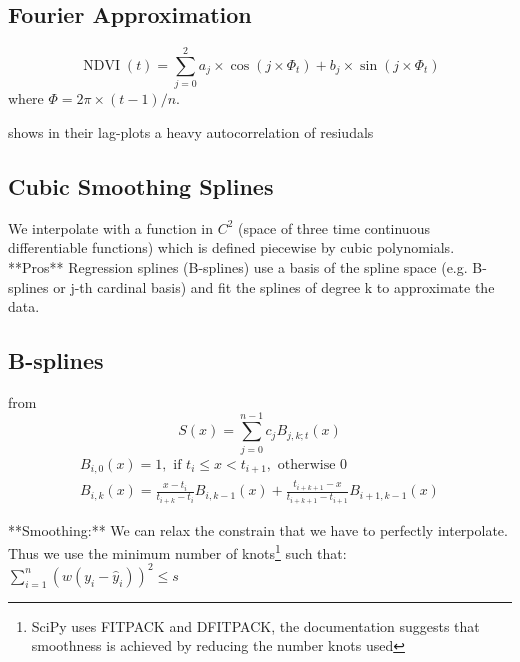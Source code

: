 \subsection{Fourier Approximation}
\label{sec:fourier_approx}
$$
    \operatorname{NDVI}(t)=\sum_{j=0}^{2} a_{j} \times \cos \left(j \times \Phi_{t}\right)+b_{j} \times \sin \left(j \times \Phi_{t}\right)
$$
where $\Phi=2 \pi \times(t-1) / n$.

\cite{beckImprovedMonitoringVegetation2006} shows in their lag-plots a heavy autocorrelation of resiudals





\subsection{Cubic Smoothing Splines}
\label{sec:Cubic}
We interpolate with a function in $C^2$ (space of three time continuous differentiable functions) which is defined piecewise by cubic polynomials.
**Pros**
Regression splines (B-splines)
\cite{woodSmoothingParameterModel2016}
use a basis of the spline space (e.g. B-splines or j-th cardinal basis) and fit the splines of degree k to approximate the data.

\subsection{B-splines}
\label{sec:B}
from \cite{lycheSplineMethods2005}
$$
    S(x)=\sum_{j=0}^{n-1} c_{j} B_{j, k ; t}(x)
$$
$$
    \begin{array}{r}
        B_{i, 0}(x)=1, \text { if } t_{i} \leq x<t_{i+1}, \text { otherwise } 0 \\
        B_{i, k}(x)=\frac{x-t_{i}}{t_{i+k}-t_{i}} B_{i, k-1}(x)+\frac{t_{i+k+1}-x}{t_{i+k+1}-t_{i+1}} B_{i+1, k-1}(x)
    \end{array}
$$

**Smoothing:**
We can relax the constrain that we have to perfectly interpolate. Thus we use the minimum number of knots\footnote{SciPy uses FITPACK and DFITPACK, the documentation suggests that smoothness is achieved by reducing the number knots used} such that:
$\sum_{i=1}^n(w (y_i - \hat y_i))^2 \leq s$

